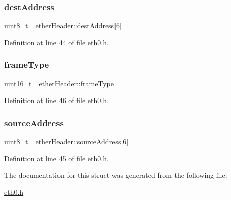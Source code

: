 \mbox{\label{struct__etherHeader_a92143e6946b3c56fcbbc1713a8afa7e0}} 
\subsubsection{\texorpdfstring{dest\+Address}{destAddress}}
{\footnotesize\ttfamily uint8\+\_\+t \+\_\+ether\+Header\+::dest\+Address\mbox{[}6\mbox{]}}



Definition at line 44 of file eth0.\+h.

\mbox{\label{struct__etherHeader_a2b501a1791fcbfa944fe6f696e874f95}} 
\subsubsection{\texorpdfstring{frame\+Type}{frameType}}
{\footnotesize\ttfamily uint16\+\_\+t \+\_\+ether\+Header\+::frame\+Type}



Definition at line 46 of file eth0.\+h.

\mbox{\label{struct__etherHeader_a20b851de2e0073e9d27776edbd3e75c5}} 
\subsubsection{\texorpdfstring{source\+Address}{sourceAddress}}
{\footnotesize\ttfamily uint8\+\_\+t \+\_\+ether\+Header\+::source\+Address\mbox{[}6\mbox{]}}



Definition at line 45 of file eth0.\+h.



The documentation for this struct was generated from the following file\+:\begin{DoxyCompactItemize}
\item 
\hyperlink{eth0_8h}{eth0.\+h}\end{DoxyCompactItemize}
